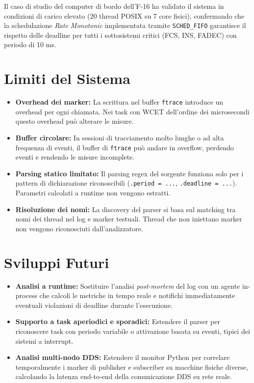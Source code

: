 Il caso di studio del computer di bordo dell'F-16 ha validato il sistema in condizioni di carico elevato (20 thread POSIX su 7 core fisici), confermando che la schedulazione \textit{Rate Monotonic} implementata tramite \texttt{SCHED\_FIFO} garantisce il rispetto delle deadline per tutti i sottosistemi critici (FCS, INS, FADEC) con periodo di 10 ms.

\section{Limiti del Sistema}
\begin{itemize}
	\item \textbf{Overhead dei marker:} La scrittura nel buffer \texttt{ftrace} introduce un overhead per ogni chiamata. Nei task con WCET dell'ordine dei microsecondi questo overhead può alterare le misure.
	\item \textbf{Buffer circolare:} In sessioni di tracciamento molto lunghe o ad alta frequenza di eventi, il buffer di \texttt{ftrace} può andare in overflow, perdendo eventi e rendendo le misure incomplete.
	\item \textbf{Parsing statico limitato:} Il parsing regex del sorgente funziona solo per i pattern di dichiarazione riconoscibili (\texttt{.period = ...}, \texttt{.deadline = ...}). Parametri calcolati a runtime non vengono estratti.
	\item \textbf{Risoluzione dei nomi:} La discovery del parser si basa sul matching tra nomi dei thread nel log e marker testuali. Thread che non iniettano marker non vengono riconosciuti dall'analizzatore.
\end{itemize}

\section{Sviluppi Futuri}
\begin{itemize}
	\item \textbf{Analisi a runtime:} Sostituire l'analisi \textit{post-mortem} del log con un agente in-process che calcoli le metriche in tempo reale e notifichi immediatamente eventuali violazioni di deadline durante l'esecuzione.
	\item \textbf{Supporto a task aperiodici e sporadici:} Estendere il parser per riconoscere task con periodo variabile o attivazione basata su eventi, tipici dei sistemi a interrupt.
	\item \textbf{Analisi multi-nodo DDS:} Estendere il monitor Python per correlare temporalmente i marker di publisher e subscriber su macchine fisiche diverse, calcolando la latenza end-to-end della comunicazione DDS su rete reale.
\end{itemize}

